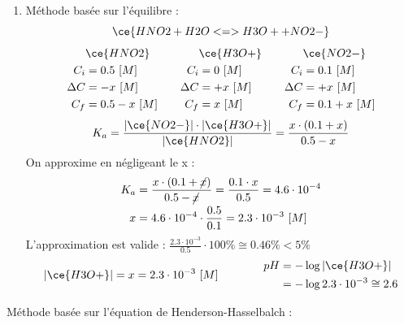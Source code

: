 \documentclass[
  11pt,
  french,
  a4paper,
  openany]{book}
\providecommand{\tightlist}{%
  \setlength{\itemsep}{0pt}\setlength{\parskip}{0pt}}
\begin{document}
\begin{Answer}

\begin{enumerate}
\def\labelenumi{\alph{enumi}.}
\tightlist
\item
  Méthode basée sur l'équilibre :
  \[
  \ce{HNO2 + H2O <=> H3O+ + NO2-}
  \]
  \[
  \begin{split}
  &\ce{HNO2}\\
  C_i &= 0.5\ [M] \\
  \Delta C &= - x\ [M] \\
  C_f &= 0.5 - x\ [M] \\
  \end{split}
  \qquad
  \begin{split}
  &\ce{H3O+}\\
  C_i &= 0\ [M] \\
  \Delta C &= + x\ [M] \\
  C_f &= x\ [M] \\
  \end{split}
  \qquad
  \begin{split}
  &\ce{NO2-}\\
  C_i &= 0.1\ [M] \\
  \Delta C &= + x\ [M] \\
  C_f &= 0.1 + x\ [M] \\
  \end{split}
  \]
  \[
  K_a = \frac{|\ce{NO2-}| \cdot |\ce{H3O+}|}{|\ce{HNO2}|} = \frac{x \cdot (0.1 + x)}{0.5 - x}
  \]
  On approxime en négligeant le x :
  \[
  \begin{split}
  K_a &= \frac{x \cdot (0.1 + \cancel{x})}{0.5 - \cancel{x}} = \frac{0.1 \cdot x}{0.5} = 4.6 \cdot 10^{-4} \\
  x &= 4.6 \cdot 10^{-4} \cdot \frac{0.5}{0.1} = 2.3 \cdot 10^{-3}\ [M]
  \end{split}
  \]
  L'approximation est valide : \(\frac{2.3 \cdot 10^{-3}}{0.5} \cdot 100\% \cong 0.46\% < 5\%\)
  \[
  \begin{split}
  |\ce{H3O+}| = x = 2.3 \cdot 10^{-3}\ [M]
  \end{split}
  \qquad\qquad
  \begin{split}
  pH &= - \log |\ce{H3O+}| \\
   &= - \log 2.3 \cdot 10^{-3} \cong 2.6
  \end{split}
  \]
\end{enumerate}

Méthode basée sur l'équation de Henderson-Hasselbalch :


\end{Answer}
\end{document}
